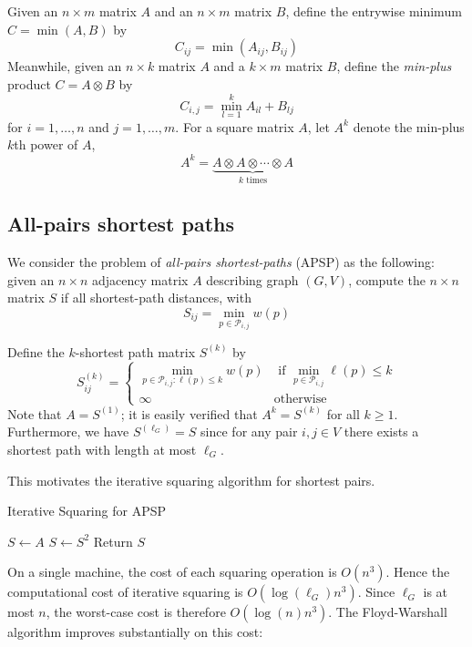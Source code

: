 \documentclass{article} %
\begin{document}
Given an $n \times m$ matrix $A$ and an $n \times m$ matrix $B$, define the entrywise minimum $C = \min(A, B)$ by
\[
C_{ij} = \min(A_{ij}, B_{ij})
\]
Meanwhile, given an $n \times k$ matrix $A$ and a $k \times m$ matrix $B$,
define the \emph{min-plus} product $C = A \otimes B$ by
\[
C_{i,j} = \min_{l = 1}^k A_{il} + B_{lj}
\]
for $i = 1,\hdots, n$ and $j = 1,\hdots, m$.
For a square matrix $A$, let $A^k$ denote the min-plus $k$th power of $A$,
\[
A^k = \underbrace{A \otimes A \otimes \cdots \otimes A}_{\text{$k$ times}}
\]

\subsection{All-pairs shortest paths}

We consider the problem of \emph{all-pairs shortest-paths} (APSP) as the
following: given an $n \times n$ adjacency matrix $A$ describing graph
$(G,V)$, compute the $n \times n$ matrix $S$ if all shortest-path distances, with
\[
S_{ij} = \min_{p \in \mathcal{P}_{i,j}} w(p)
\]

Define the $k$-shortest path matrix $S^{(k)}$ by
\[
S^{(k)}_{ij} = \begin{cases} \min_{p \in \mathcal{P}_{i, j}: \ell(p) \leq k} w(p) &\text{ if }\min_{p \in \mathcal{P}_{i,j}} \ell(p) \leq k\\
\infty & \text{otherwise}
\end{cases}
\]
Note that $A = S^{(1)}$; it is easily verified that $A^k = S^{(k)}$
for all $k \geq 1$.  Furthermore, we have $S^{(\ell_G)} = S$ since for
any pair $i, j \in V$ there exists a shortest path with length at most
$\ell_G$.

This motivates the iterative squaring algorithm for shortest pairs.

\begin{algorithm}[H]
\caption{Iterative Squaring for APSP}
\begin{algorithmic}
  \State $S \leftarrow A$
    \State $S \leftarrow S^2$
  \EndFor
  \State Return $S$
\EndFunction
\end{algorithmic}
\end{algorithm}

On a single machine, the cost of each squaring operation is $O(n^3)$.
Hence the computational cost of iterative squaring is $O(\log(\ell_G) n^3)$.
Since $\ell_G$ is at most $n$, the worst-case cost is therefore $O(\log(n) n^3)$.
The Floyd-Warshall algorithm improves substantially on this cost:
\end{document}
